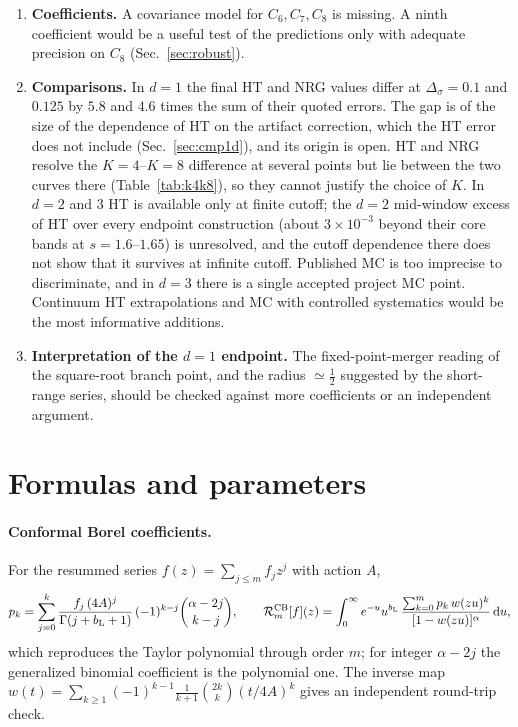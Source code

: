 \documentclass[11pt,a4paper]{article}
\numberwithin{equation}{section}
\newcommand{\dd}{\,\mathrm d}
\newcommand{\Ds}{\Delta_\sigma}
\newcommand{\bL}{b_{\mathrm L}}
\newcommand{\cR}{\mathcal R}
\newcommand{\sci}[2]{#1\times10^{#2}}
\begin{document}
\begin{enumerate}
tests.
\item \textbf{Coefficients.} A covariance model for $C_6,C_7,C_8$ is missing. A ninth
coefficient would be a useful test of the predictions only with adequate precision on $C_8$
(Sec.~\ref{sec:robust}).
\item \textbf{Comparisons.} In $d=1$ the final HT and NRG values differ at $\Ds=0.1$ and
$0.125$ by $5.8$ and $4.6$ times the sum of their quoted errors. The gap is of the size of the
dependence of HT on the artifact correction, which the HT error does not include
(Sec.~\ref{sec:cmp1d}), and its origin is open. HT and NRG resolve the $K=4$--$K=8$ difference at
several points but lie between the two curves there (Table~\ref{tab:k4k8}), so they cannot
justify the choice of $K$. In $d=2$ and $3$ HT is available only at finite cutoff; the $d=2$
mid-window excess of HT over every endpoint construction (about $\sci{3}{-3}$ beyond their
core bands at $s=1.6$--$1.65$) is unresolved, and the cutoff dependence there does not show
that it survives at infinite cutoff. Published MC is too imprecise to discriminate, and in
$d=3$ there is a single accepted project MC point. Continuum HT extrapolations and MC with
controlled systematics would be the most informative additions.
\item \textbf{Interpretation of the $d=1$ endpoint.} The fixed-point-merger reading of the
square-root branch point, and the radius $\simeq\frac12$ suggested by the short-range series,
should be checked against more coefficients or an independent argument.
\end{enumerate}

\appendix
\section{Formulas and parameters}\label{app:formulas}
\paragraph{Conformal Borel coefficients.} For the resummed series $f(z)=\sum_{j\le m}f_jz^j$
with action $A$,
\begin{equation}
 p_k=\sum_{j=0}^k\frac{f_j\,(4A)^j}{\Gamma(j+\bL+1)}\,(-1)^{k-j}\binom{\alpha-2j}{k-j},\qquad
 \cR_m^{\rm CB}[f](z)=\int_0^\infty e^{-u}u^{\bL}\,
 \frac{\sum_{k=0}^mp_k\,w(zu)^k}{[1-w(zu)]^\alpha}\dd u ,
 \label{eq:pk}
\end{equation}
which reproduces the Taylor polynomial through order $m$; for integer $\alpha-2j$ the
generalized binomial coefficient is the polynomial one. The inverse map
$w(t)=\sum_{k\ge1}(-1)^{k-1}\frac{1}{k+1}\binom{2k}{k}(t/4A)^k$ gives an independent
round-trip check.
\end{document}
